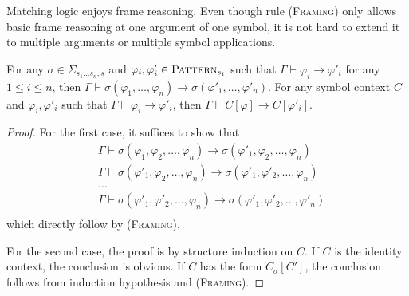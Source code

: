 \documentclass[acmsmall]{acmart}
\theoremstyle{acmdefinition}
\newcommand{\imp}{\to}
\newcommand{\Pattern}{\textnormal{\textsc{Pattern}}}
\newcommand{\CSub}[1]{C_{#1}}
\newcommand{\Csigmaapp}[1]{\CSub{\sigma}[#1]}
\newcommand{\prule}[1]{\textsc{(#1)}}
\newcommand{\framing}{\prule{Framing}\xspace}
\newcommand{\ddd}{,\dots,}
\newcommand{\SigmaSub}[1]{\Sigma_{#1}}
\begin{document}
Matching logic enjoys frame reasoning.
Even though rule \framing only allows basic frame reasoning
at one argument of one symbol, 
it is not hard to extend it to multiple arguments
or multiple symbol applications.

\begin{proposition}
	\label{prop_framing}
For any $\sigma \in \SigmaSub{s_1 \dots s_n , s}$ and 
$\varphi_i, \varphi'_i \in \Pattern_{s_i}$
such that $\Gamma \vdash \varphi_i \imp \varphi'_i$
for any $1 \le i \le n$,
then $\Gamma \vdash 
\sigma(\varphi_1 \ddd \varphi_n) \imp
\sigma(\varphi'_1 \ddd \varphi'_n)$.
For any symbol context $C$ and $\varphi_i, \varphi'_i$ such that
$\Gamma \vdash \varphi_i \imp \varphi'_i$,
then $\Gamma \vdash C[\varphi] \imp C[\varphi'_i]$.
\end{proposition}
\begin{proof}
For the first case,
it suffices to show that
\begin{align*}
&\Gamma \vdash \sigma(\varphi_1 , \varphi_2 \ddd \varphi_n)
          \imp \sigma(\varphi'_1, \varphi_2 \ddd \varphi_n) \\
&\Gamma \vdash \sigma(\varphi'_1 , \varphi_2 \ddd \varphi_n)
          \imp \sigma(\varphi'_1, \varphi'_2 \ddd \varphi_n) \\
& \dots \\
&\Gamma \vdash \sigma(\varphi'_1 , \varphi'_2 \ddd \varphi_n)
          \imp \sigma(\varphi'_1, \varphi'_2 \ddd \varphi'_n) \\
\end{align*}
which directly follow by \framing.

For the second case,
the proof is by structure induction on $C$.
If $C$ is the identity context, the conclusion is obvious.
If $C$ has the form $\Csigmaapp{C'}$, the conclusion follows from
induction hypothesis and \framing.
\end{proof}
\end{document}
